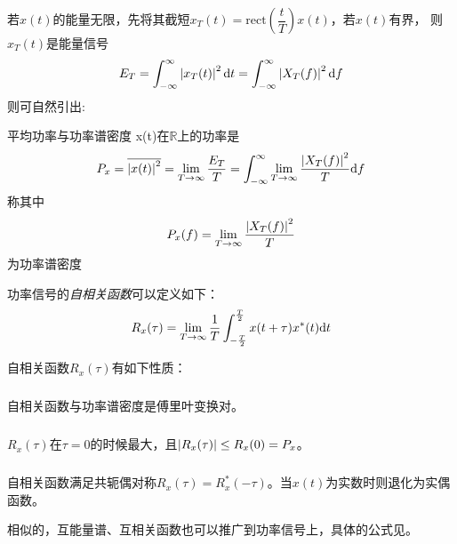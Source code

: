     若$x(t)$的能量无限，先将其截短$x_T(t)=\text{rect}(\dfrac{t}{T})x(t)$，若$x(t)$有界，
    则$x_T(t)$是能量信号
    \begin{equation}
        E_T=\int_{-\infty}^{\infty}\left\vert x_T(t) \right\vert^2\text{\upshape d} t=\int_{-\infty}^{\infty}\left\vert X_T(f) \right\vert^2\text{\upshape d} f
    \end{equation}
    则可自然引出:
    \begin{mydef}{平均功率与功率谱密度}
        x(t)在$\mathbb{R}$上的功率是
        \begin{equation}
            P_x=\overline{\left\vert x(t) \right\vert^2}=\lim_{T\to\infty}\frac{E_T}{T}=\int_{-\infty}^{\infty}\lim_{T\to\infty}\frac{\left\vert X_T(f) \right\vert^2}{T}\text{\upshape d} f
        \end{equation}
        称其中
        \begin{equation}
            P_x(f)=\lim_{T\to\infty}\frac{\left\vert X_T(f) \right\vert^2}{T}
        \end{equation}
        为功率谱密度
    \end{mydef}

    功率信号的\emph{自相关函数}可以定义如下：
    \begin{equation}
        R_x(\tau)=\lim_{T\to\infty}\frac{1}{T}\int_{-\frac{T}{2}}^{\frac{T}{2}}x(t+\tau)x^*(t)\text{\upshape d} t
    \end{equation}

    自相关函数$R_x(\tau)$有如下性质：
    \subparagraph{\hspace{-1em}}自相关函数与功率谱密度是傅里叶变换对。

    \subparagraph{\hspace{-1em}}$R_x(\tau)$在$\tau=0$的时候最大，且$\left\vert R_x(\tau) \right\vert\leq R_x(0)=P_x$。

    \subparagraph{\hspace{-1em}}自相关函数满足共轭偶对称$R_x(\tau)=R^*_x(-\tau)$。当$x(t)$为实数时则退化为实偶函数。

    相似的，互能量谱、互相关函数也可以推广到功率信号上，具体的公式见。

